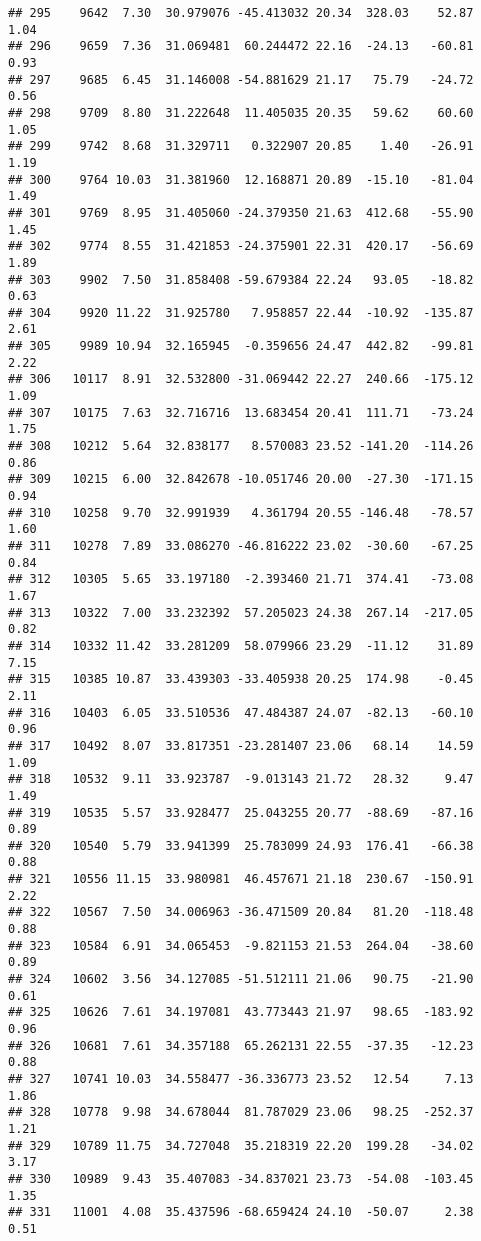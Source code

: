 \documentclass[]{article}
\begin{document}
\begin{verbatim}
## 295    9642  7.30  30.979076 -45.413032 20.34  328.03    52.87  1.04
## 296    9659  7.36  31.069481  60.244472 22.16  -24.13   -60.81  0.93
## 297    9685  6.45  31.146008 -54.881629 21.17   75.79   -24.72  0.56
## 298    9709  8.80  31.222648  11.405035 20.35   59.62    60.60  1.05
## 299    9742  8.68  31.329711   0.322907 20.85    1.40   -26.91  1.19
## 300    9764 10.03  31.381960  12.168871 20.89  -15.10   -81.04  1.49
## 301    9769  8.95  31.405060 -24.379350 21.63  412.68   -55.90  1.45
## 302    9774  8.55  31.421853 -24.375901 22.31  420.17   -56.69  1.89
## 303    9902  7.50  31.858408 -59.679384 22.24   93.05   -18.82  0.63
## 304    9920 11.22  31.925780   7.958857 22.44  -10.92  -135.87  2.61
## 305    9989 10.94  32.165945  -0.359656 24.47  442.82   -99.81  2.22
## 306   10117  8.91  32.532800 -31.069442 22.27  240.66  -175.12  1.09
## 307   10175  7.63  32.716716  13.683454 20.41  111.71   -73.24  1.75
## 308   10212  5.64  32.838177   8.570083 23.52 -141.20  -114.26  0.86
## 309   10215  6.00  32.842678 -10.051746 20.00  -27.30  -171.15  0.94
## 310   10258  9.70  32.991939   4.361794 20.55 -146.48   -78.57  1.60
## 311   10278  7.89  33.086270 -46.816222 23.02  -30.60   -67.25  0.84
## 312   10305  5.65  33.197180  -2.393460 21.71  374.41   -73.08  1.67
## 313   10322  7.00  33.232392  57.205023 24.38  267.14  -217.05  0.82
## 314   10332 11.42  33.281209  58.079966 23.29  -11.12    31.89  7.15
## 315   10385 10.87  33.439303 -33.405938 20.25  174.98    -0.45  2.11
## 316   10403  6.05  33.510536  47.484387 24.07  -82.13   -60.10  0.96
## 317   10492  8.07  33.817351 -23.281407 23.06   68.14    14.59  1.09
## 318   10532  9.11  33.923787  -9.013143 21.72   28.32     9.47  1.49
## 319   10535  5.57  33.928477  25.043255 20.77  -88.69   -87.16  0.89
## 320   10540  5.79  33.941399  25.783099 24.93  176.41   -66.38  0.88
## 321   10556 11.15  33.980981  46.457671 21.18  230.67  -150.91  2.22
## 322   10567  7.50  34.006963 -36.471509 20.84   81.20  -118.48  0.88
## 323   10584  6.91  34.065453  -9.821153 21.53  264.04   -38.60  0.89
## 324   10602  3.56  34.127085 -51.512111 21.06   90.75   -21.90  0.61
## 325   10626  7.61  34.197081  43.773443 21.97   98.65  -183.92  0.96
## 326   10681  7.61  34.357188  65.262131 22.55  -37.35   -12.23  0.88
## 327   10741 10.03  34.558477 -36.336773 23.52   12.54     7.13  1.86
## 328   10778  9.98  34.678044  81.787029 23.06   98.25  -252.37  1.21
## 329   10789 11.75  34.727048  35.218319 22.20  199.28   -34.02  3.17
## 330   10989  9.43  35.407083 -34.837021 23.73  -54.08  -103.45  1.35
## 331   11001  4.08  35.437596 -68.659424 24.10  -50.07     2.38  0.51

\end{verbatim}
\end{document}
